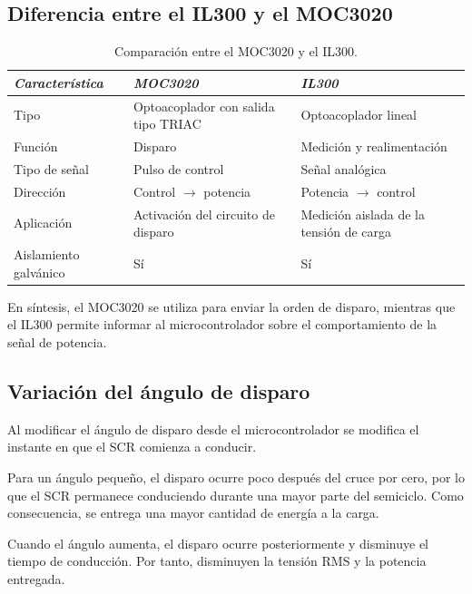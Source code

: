 \documentclass[12pt]{article}
\begin{document}
\subsection{Diferencia entre el IL300 y el MOC3020}

\begin{table}[H]
\centering
\caption{Comparación entre el MOC3020 y el IL300.}
\label{tComparacionOptos}
\begin{tabular}{p{4cm} p{5cm} p{5cm}}
\toprule
\textit{Característica} & \textit{MOC3020} & \textit{IL300} \\
\midrule
Tipo &
Optoacoplador con salida tipo TRIAC &
Optoacoplador lineal \\

Función &
Disparo &
Medición y realimentación \\

Tipo de señal &
Pulso de control &
Señal analógica \\

Dirección &
Control $\rightarrow$ potencia &
Potencia $\rightarrow$ control \\

Aplicación &
Activación del circuito de disparo &
Medición aislada de la tensión de carga \\

Aislamiento galvánico &
Sí &
Sí \\

\bottomrule
\end{tabular}
\end{table}

En síntesis, el MOC3020 se utiliza para enviar la orden de disparo,
mientras que el IL300 permite informar al microcontrolador sobre el
comportamiento de la señal de potencia.

\subsection{Variación del ángulo de disparo}

Al modificar el ángulo de disparo desde el microcontrolador se modifica el
instante en que el SCR comienza a conducir.

Para un ángulo pequeño, el disparo ocurre poco después del cruce por cero,
por lo que el SCR permanece conduciendo durante una mayor parte del
semiciclo. Como consecuencia, se entrega una mayor cantidad de energía a
la carga.

Cuando el ángulo aumenta, el disparo ocurre posteriormente y disminuye el
tiempo de conducción. Por tanto, disminuyen la tensión RMS y la potencia
entregada.
\end{document}

